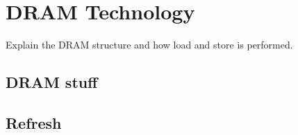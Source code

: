 \section{DRAM Technology} 
\label{sec:technology}

Explain the DRAM structure and how load and store is performed.
\subsection{DRAM stuff}


\subsection{Refresh}